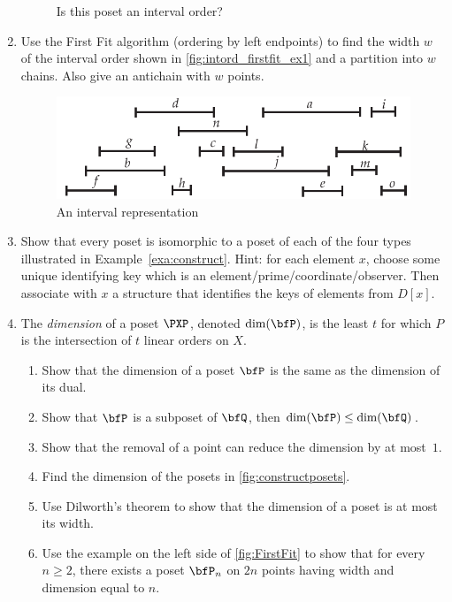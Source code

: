 \begin{enumerate}
\begin{figure}[h]
\begin{center}
  \end{center}
  \caption{Is this poset an interval order?}\label{fig:intord_find_rep_ex3}
  \end{figure}
\item Use the First Fit algorithm (ordering by left endpoints) to find
  the width $w$ of the interval order shown in
  \autoref{fig:intord_firstfit_ex1} and a partition into $w$
  chains. Also give an antichain with $w$ points.
  \begin{figure}[h]
    \centering
    \includegraphics{posets-figs/intord_firstfit_ex1}
    \caption{An interval representation}
    \label{fig:intord_firstfit_ex1}
  \end{figure}
\item Show that every poset is isomorphic to a poset of each of the four types
  illustrated in Example~\ref{exa:construct}.  Hint: for each element $x$, choose
  some unique identifying key which is an element/prime/coordinate/observer.  Then associate
  with $x$ a structure that identifies the keys of elements from $D[x]$. 
\item The \textit{dimension} of a poset $\PXP$, denoted $\dim(\bfP)$, is the least $t$ for 
  which $P$ is the intersection of $t$ linear orders on $X$.
  \begin{enumerate}
   \item Show that the dimension of a poset $\bfP$ is the same as the dimension of its dual.
   \item Show that $\bfP$ is a subposet of $\bfQ$, then $\dim(\bfP)\le \dim(\bfQ)$.
   \item Show that the removal of a point can reduce the dimension by at most~$1$.
   \item Find the dimension of the posets in \autoref{fig:constructposets}.
   \item Use Dilworth's theorem to show that the dimension of a poset is at most its width.
   \item Use the example on the left side of \autoref{fig:FirstFit} to show that
   for every $n\ge2$, there exists a poset $\bfP_n$ on $2n$ points having width and dimension
   equal to $n$.
   \end{enumerate}
\end{enumerate}

